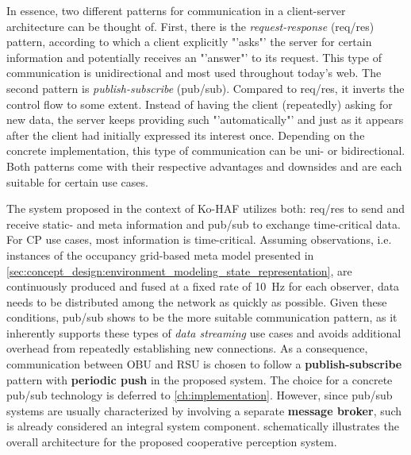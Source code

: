 In essence, two different patterns for communication in a client-server architecture can be thought of. First, there is the \textit{request-response} (req/res) pattern, according to which a client explicitly "'asks"' the server for certain information and potentially receives an "'answer"' to its request. This type of communication is unidirectional and most used throughout today's web. The second pattern is \textit{publish-subscribe} (pub/sub). Compared to req/res, it inverts the control flow to some extent. Instead of having the client (repeatedly) asking for new data, the server keeps providing such "'automatically"' and just as it appears after the client had initially expressed its interest once. Depending on the concrete implementation, this type of communication can be uni- or bidirectional. Both patterns come with their respective advantages and downsides and are each suitable for certain use cases.

The system proposed in the context of Ko-HAF \cite{Hohm2019} utilizes both: req/res to send and receive static- and meta information and pub/sub to exchange time-critical data. For CP use cases, most information is time-critical. Assuming observations, i.e. instances of the occupancy grid-based meta model presented in \cref{sec:concept_design:environment_modeling_state_representation}, are continuously produced and fused at a fixed rate of \SI{10}{\hertz} for each observer, data needs to be distributed among the network as quickly as possible. Given these conditions, pub/sub shows to be the more suitable communication pattern, as it inherently supports these types of \textit{data streaming} use cases and avoids additional overhead from repeatedly establishing new connections. As a consequence, communication between OBU and RSU is chosen to follow a \textbf{publish-subscribe} pattern with \textbf{periodic push} in the proposed system. The choice for a concrete pub/sub technology is deferred to \cref{ch:implementation}. However, since pub/sub systems are usually characterized by involving a separate \textbf{message broker}, such is already considered an integral system component.  schematically illustrates the overall architecture for the proposed cooperative perception system.


